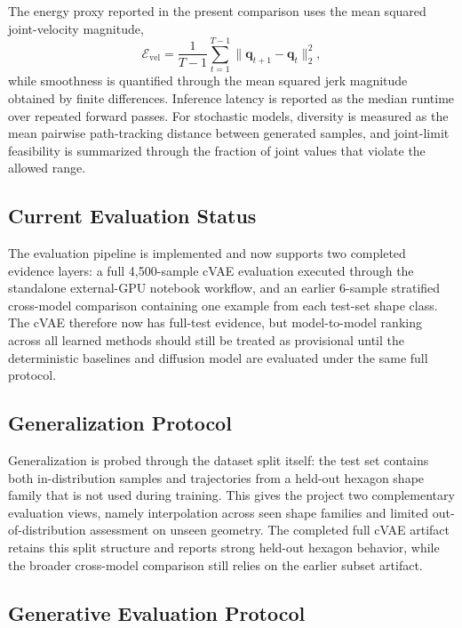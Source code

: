 \documentclass[11pt]{article}
\begin{document}
The energy proxy reported in the present comparison uses the mean squared joint-velocity magnitude,
\begin{equation}
    \mathcal{E}_{\mathrm{vel}}
    =
    \frac{1}{T-1}\sum_{t=1}^{T-1}\|\mathbf{q}_{t+1} - \mathbf{q}_t\|_2^2,
\end{equation}
while smoothness is quantified through the mean squared jerk magnitude obtained by finite differences. Inference latency is reported as the median runtime over repeated forward passes. For stochastic models, diversity is measured as the mean pairwise path-tracking distance between generated samples, and joint-limit feasibility is summarized through the fraction of joint values that violate the allowed range.

\subsection{Current Evaluation Status}

The evaluation pipeline is implemented and now supports two completed evidence layers: a full 4,500-sample cVAE evaluation executed through the standalone external-GPU notebook workflow, and an earlier 6-sample stratified cross-model comparison containing one example from each test-set shape class. The cVAE therefore now has full-test evidence, but model-to-model ranking across all learned methods should still be treated as provisional until the deterministic baselines and diffusion model are evaluated under the same full protocol.

\subsection{Generalization Protocol}

Generalization is probed through the dataset split itself: the test set contains both in-distribution samples and trajectories from a held-out hexagon shape family that is not used during training. This gives the project two complementary evaluation views, namely interpolation across seen shape families and limited out-of-distribution assessment on unseen geometry. The completed full cVAE artifact retains this split structure and reports strong held-out hexagon behavior, while the broader cross-model comparison still relies on the earlier subset artifact.

\subsection{Generative Evaluation Protocol}
\end{document}
